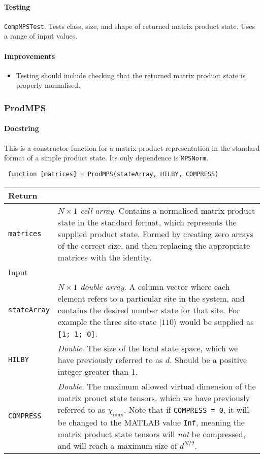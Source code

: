  \paragraph{Testing}
 \lstinline$CompMPSTest$. Tests class, size, and shape of returned matrix product state. Uses a range of input values.
 \paragraph{Improvements}
 \begin{itemize}
 \item Testing should include checking that the returned matrix product state is properly normalised.
 \end{itemize}
 
 \subsubsection{ProdMPS}
 \paragraph{Docstring}
 This is a constructor function for a matrix product representation in the standard format of a simple product state. Its only dependence is \lstinline$MPSNorm$.
 \begin{lstlisting}
 function [matrices] = ProdMPS(stateArray, HILBY, COMPRESS) \end{lstlisting}
 \begin{longtabu}{X[1,l]X[4,l]}
 \hline
 Return & \\ \hline
 \lstinline$matrices$ & \emph{\(N \times 1\) cell array}. Contains a normalised matrix product state in the standard format, which represents the supplied product state. Formed by creating zero arrays of the correct size, and then replacing the appropriate matrices with the identity. \\ \hline
 Input & \\ \hline
 \lstinline$stateArray$ & \emph{\(N \times 1\) double array}. A column vector where each element refers to a particular site in the system, and contains the desired number state for that site. For example the three site state \(|1 1 0 \rangle\) would be supplied as \lstinline$[1; 1; 0]$. \\
 \lstinline$HILBY$ & \emph{Double}. The size of the local state space, which we have previously referred to as \(d\). Should be a positive integer greater than 1.  \\
 \lstinline$COMPRESS$ & \emph{Double}. The maximum allowed virtual dimension of the matrix prouct state tensors, which we have previously referred to as \(\chi_{\mathrm{max}}\). Note that if \lstinline$COMPRESS = 0$, it will be changed to the MATLAB value \lstinline$Inf$, meaning the matrix product state tensors will \emph{not} be compressed, and will reach a maximum size of \(d^{N/2}\).  \\
 \hline
 \end{longtabu}
